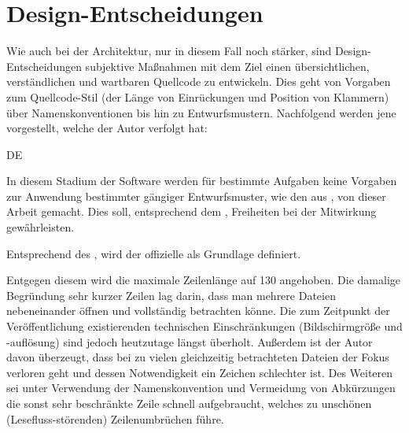 \section{Design-Entscheidungen}\label{sec:design-entscheidungen}

Wie auch bei der Architektur, nur in diesem Fall noch stärker, sind Design-Entscheidungen subjektive Maßnahmen mit dem Ziel einen übersichtlichen, verständlichen und wartbaren Quellcode zu entwickeln.
Dies geht von Vorgaben zum Quellcode-Stil (\zB der Länge von Einrückungen und Position von Klammern) über Namenskonventionen bis hin zu Entwurfsmustern.
Nachfolgend werden jene vorgestellt, welche der Autor verfolgt hat:

\begin{enumerateWithCode}[0em plus 1em]{DE}

    \item In diesem Stadium der Software werden für bestimmte Aufgaben keine Vorgaben zur Anwendung bestimmter gängiger Entwurfsmuster, wie \zB den  aus , von dieser Arbeit gemacht.
    Dies soll, entsprechend dem , Freiheiten bei der Mitwirkung gewährleisten.

    \item Entsprechend des , wird der offizielle    als Grundlage definiert.

    \item Entgegen diesem wird die maximale Zeilenlänge auf 130 angehoben.
    Die damalige Begründung sehr kurzer Zeilen lag darin, dass man mehrere Dateien nebeneinander öffnen und vollständig betrachten könne.
    Die zum Zeitpunkt der Veröffentlichung existierenden technischen Einschränkungen (Bildschirmgröße und -auflösung) sind jedoch heutzutage längst überholt.
    Außerdem ist der Autor davon überzeugt, dass bei zu vielen gleichzeitig betrachteten Dateien der Fokus verloren geht und dessen Notwendigkeit ein Zeichen schlechter  ist.
    Des Weiteren sei unter Verwendung der Namenskonvention und Vermeidung von Abkürzungen die sonst sehr beschränkte Zeile schnell aufgebraucht, welches zu unschönen (Lesefluss-störenden) Zeilenumbrüchen führe.


\end{enumerateWithCode}

